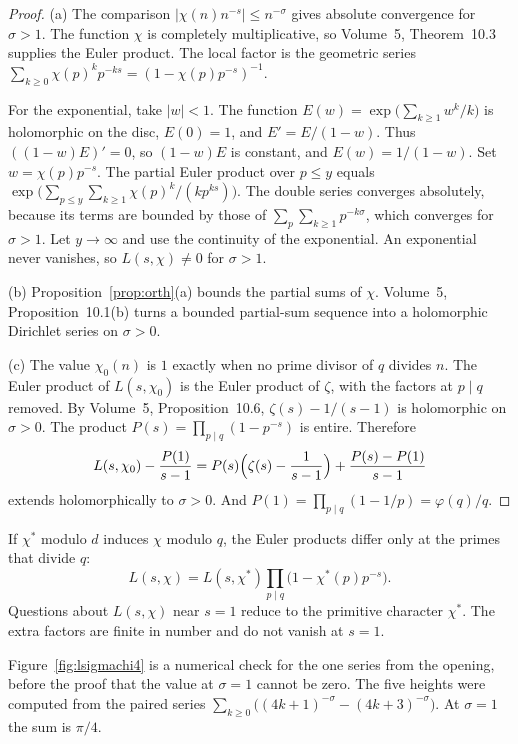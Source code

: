 \begin{proof}
(a) The comparison $|\chi(n)n^{-s}|\le n^{-\sigma}$ gives absolute convergence for $\sigma>1$. The function $\chi$ is completely multiplicative, so Volume~5, Theorem~10.3 supplies the Euler product. The local factor is the geometric series $\sum_{k\ge0}\chi(p)^kp^{-ks}=(1-\chi(p)p^{-s})^{-1}$.

For the exponential, take $|w|<1$. The function $E(w)=\exp\bigl(\sum_{k\ge1}w^k/k\bigr)$ is holomorphic on the disc, $E(0)=1$, and $E'=E/(1-w)$. Thus $((1-w)E)'=0$, so $(1-w)E$ is constant, and $E(w)=1/(1-w)$. Set $w=\chi(p)p^{-s}$. The partial Euler product over $p\le y$ equals $\exp\bigl(\sum_{p\le y}\sum_{k\ge1}\chi(p)^k/(kp^{ks})\bigr)$. The double series converges absolutely, because its terms are bounded by those of $\sum_p\sum_{k\ge1}p^{-k\sigma}$, which converges for $\sigma>1$. Let $y\to\infty$ and use the continuity of the exponential. An exponential never vanishes, so $L(s,\chi)\ne0$ for $\sigma>1$.

(b) Proposition~\ref{prop:orth}(a) bounds the partial sums of $\chi$. Volume~5, Proposition~10.1(b) turns a bounded partial-sum sequence into a holomorphic Dirichlet series on $\sigma>0$.

(c) The value $\chi_0(n)$ is $1$ exactly when no prime divisor of $q$ divides $n$. The Euler product of $L(s,\chi_0)$ is the Euler product of $\zeta$, with the factors at $p\mid q$ removed. By Volume~5, Proposition~10.6, $\zeta(s)-1/(s-1)$ is holomorphic on $\sigma>0$. The product $P(s)=\prod_{p\mid q}(1-p^{-s})$ is entire. Therefore
\[
L(s,\chi_0)-\frac{P(1)}{s-1}=P(s)\Bigl(\zeta(s)-\frac1{s-1}\Bigr)+\frac{P(s)-P(1)}{s-1}
\]
extends holomorphically to $\sigma>0$. And $P(1)=\prod_{p\mid q}(1-1/p)=\varphi(q)/q$.
\end{proof}

If $\chi^*$ modulo $d$ induces $\chi$ modulo $q$, the Euler products differ only at the primes that divide $q$:
\[
L(s,\chi)=L(s,\chi^*)\prod_{p\mid q}\bigl(1-\chi^*(p)p^{-s}\bigr).
\]
Questions about $L(s,\chi)$ near $s=1$ reduce to the primitive character $\chi^*$. The extra factors are finite in number and do not vanish at $s=1$.

Figure~\ref{fig:lsigmachi4} is a numerical check for the one series from the opening, before the proof that the value at $\sigma=1$ cannot be zero. The five heights were computed from the paired series $\sum_{k\ge0}\bigl((4k+1)^{-\sigma}-(4k+3)^{-\sigma}\bigr)$. At $\sigma=1$ the sum is $\pi/4$.

